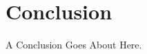 \documentclass[10pt,letter,oneside]{scrartcl}
\begin{document}


\section{Conclusion}

A Conclusion Goes About Here. 



\end{document}
